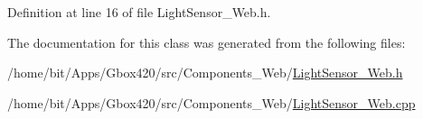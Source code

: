Definition at line 16 of file Light\+Sensor\+\_\+\+Web.\+h.



The documentation for this class was generated from the following files\+:\begin{DoxyCompactItemize}
\item 
/home/bit/\+Apps/\+Gbox420/src/\+Components\+\_\+\+Web/\hyperlink{_light_sensor___web_8h}{Light\+Sensor\+\_\+\+Web.\+h}\item 
/home/bit/\+Apps/\+Gbox420/src/\+Components\+\_\+\+Web/\hyperlink{_light_sensor___web_8cpp}{Light\+Sensor\+\_\+\+Web.\+cpp}\end{DoxyCompactItemize}
